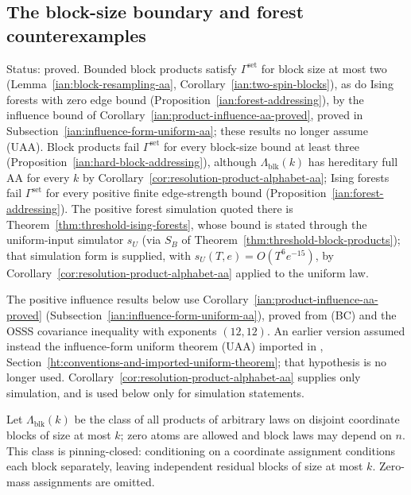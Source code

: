 \subsection{The block-size boundary and forest counterexamples}
\label{ian:gamma-set-blocks-and-forests}

Status: proved. Bounded block products satisfy
\(\Gamma^{\mathrm{set}}\) for block size at most two
(Lemma~\ref{ian:block-resampling-aa},
Corollary~\ref{ian:two-spin-blocks}), as do Ising forests with zero
edge bound (Proposition~\ref{ian:forest-addressing}), by the influence
bound of Corollary~\ref{ian:product-influence-aa-proved}, proved in
Subsection~\ref{ian:influence-form-uniform-aa}; these results no longer
assume (UAA). Block products fail
\(\Gamma^{\mathrm{set}}\) for every block-size bound at least three
(Proposition~\ref{ian:hard-block-addressing}), although
\(\Lambda_{\mathrm{blk}}(k)\) has hereditary full AA for every \(k\) by
Corollary~\ref{cor:resolution-product-alphabet-aa}; Ising forests fail
\(\Gamma^{\mathrm{set}}\) for every positive finite edge-strength bound
(Proposition~\ref{ian:forest-addressing}). The positive forest
simulation quoted there is
Theorem~\ref{thm:threshold-ising-forests}, whose bound is stated
through the uniform-input simulator \(s_U\) (via
\(S_B\) of Theorem~\ref{thm:threshold-block-products}); that simulation
form is supplied, with \(s_U(T,e)=O(T^6e^{-15})\), by
Corollary~\ref{cor:resolution-product-alphabet-aa} applied to the
uniform law.

The positive influence results below use Corollary~\ref{ian:product-influence-aa-proved} (Subsection~\ref{ian:influence-form-uniform-aa}), proved from (BC) and the OSSS covariance inequality with exponents \((12,12)\). An earlier version assumed instead the influence-form uniform theorem (UAA) imported in , Section~\ref{ht:conventions-and-imported-uniform-theorem}; that hypothesis is no longer used. Corollary~\ref{cor:resolution-product-alphabet-aa} supplies only simulation, and is used below only for simulation statements.

Let \(\Lambda_{\mathrm{blk}}(k)\) be the class of all products of arbitrary laws on disjoint coordinate blocks of size at most \(k\); zero atoms are allowed and block laws may depend on \(n\). This class is pinning-closed: conditioning
on a coordinate assignment conditions each block separately, leaving
independent residual blocks of size at most \(k\). Zero-mass
assignments are omitted.

